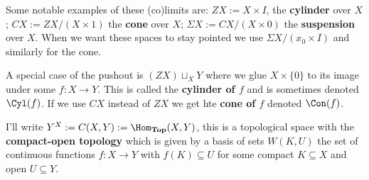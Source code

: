 \documentclass[a4paper]{article}
\begin{document}
Some notable examples of these (co)limits are: $ZX := X\times I$, the \textbf{cylinder} over $X$; $CX := ZX/(X\times 1)$ the \textbf{cone} over $X$; $\Sigma X := CX/(X\times 0)$ the \textbf{suspension} over $X$. When we want these spaces to stay pointed we use $\Sigma X / (x_0\times I)$ and similarly for the cone.

A special case of the pushout is $(ZX) \sqcup_X Y$ where we glue $X\times \{0\}$ to its image under some $f:X\rightarrow Y$. This is called the \textbf{cylinder of $f$} and is sometimes denoted $\Cyl(f)$. If we use $CX$ instead of $ZX$ we get hte \textbf{cone of $f$} denoted $\Con(f)$.

\begin{definition}
    I'll write $Y^X := C(X,Y) := \Hom_\textbf{Top}(X,Y)$, this is a topological space with the \textbf{compact-open topology} which is given by a basis of sets $W(K,U)$ the set of continuous functions $f:X\rightarrow Y$ with $f(K)\subseteq U$ for some compact $K\subseteq X$ and open $U\subseteq Y$.
\end{definition}
\end{document}
